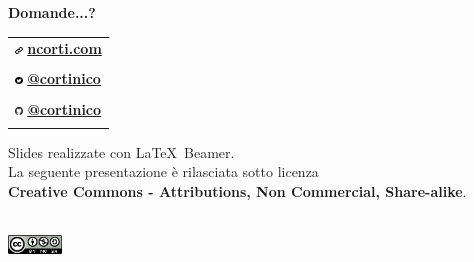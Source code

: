 \documentclass[xcolor=svgnames,11pt]{beamer}
\begin{document}
\begin{frame}{}
\begin{center}
\begin{Huge}
{\color{leorange} \textbf{Domande...?}}
\end{Huge}

\vspace{1.5cm}

\begin{center}
\begin{tabular}{>{\centering\arraybackslash}p{4cm}}
\includegraphics[height=0.2cm]{img/logo_web.pdf} \textbf{\href{https://ncorti.com}{ ncorti.com}} \\
 \\
\includegraphics[height=0.2cm]{img/logo_twitter.pdf} \textbf{\href{https://twitter.com/cortinico}{ @cortinico}} \\
 \\
\includegraphics[height=0.2cm]{img/logo_gh.pdf} \textbf{\href{https://github.com/cortinico}{ @cortinico}} \\ \\
\end{tabular}
\end{center}

\bigskip

\begin{footnotesize}
Slides realizzate con \LaTeX\ Beamer.\\
La seguente presentazione \`e rilasciata sotto licenza\\
\textbf{Creative Commons - Attributions, Non Commercial, Share-alike}.
\end{footnotesize}
\\
\medskip
\includegraphics[height=0.5cm]{img/cc.png}

\end{center}
\end{frame}
\end{document}
